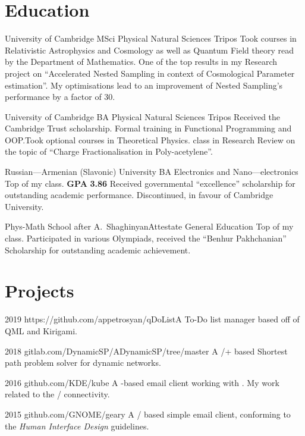 \documentclass{CurriculumVitae}[10pt, draft, condensed]
\begin{document}
\section*{Education}

 {University of Cambridge} {MSci } {
  Physical Natural Sciences Tripos} {Took courses in Relativistic
  Astrophysics and Cosmology as well as Quantum Field theory read by
  the Department of Mathematics. One of the top results in my Research
  project on ``Accelerated Nested Sampling in context of Cosmological
  Parameter estimation''. My optimisations lead to an improvement of
  Nested Sampling's performance by a factor of 30. }

 {University of Cambridge} {BA }{Physical Natural
  Sciences Tripos} {Received the Cambridge Trust scholarship. Formal
  training in Functional Programming and OOP.\@ Took optional courses
  in Theoretical Physics.  class in Research Review on the
  topic of ``Charge Fractionalisation in Poly-acetylene''.}

 {Russian---Armenian (Slavonic) University}
{BA }{Electronics and Nano---electronics} {Top of my class. \textbf{GPA}
  \textbf{3.86} Received governmental ``excellence'' scholarship for
  outstanding academic performance. Discontinued, in favour of
  Cambridge University.}

 {Phys-Math School after
  A.~Shaghinyan}{Attestate }{General Education} {Top of my
  class. Participated in various Olympiads, received the ``Benhur
  Pakhchanian'' Scholarship for outstanding academic achievement. }

\section*{Projects}

 {2019}
{https://github.com/appetrosyan/qDoList}{A To-Do
  list manager based off of QML and Kirigami.}

 {2018}
{gitlab.com/DynamicSP/ADynamicSP/tree/master} {A
  /+ based Shortest path problem solver
  for dynamic networks. }

 {2016} {github.com/KDE/kube} {A -based
  email client working with . My work related to
  the / connectivity. }

 {2015} {github.com/GNOME/geary} {A
  / based simple email client, conforming to
  the  \emph{Human Interface Design} guidelines.}
\end{document}
